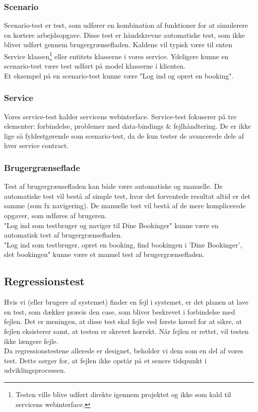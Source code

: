 \subsubsection{Scenario}
\label{Test_intendedStrat_types_sce}
Scenario-test er test, som udfører en kombination af funktioner for at simulerere en kortere arbejdsopgave. Disse test er håndskrevne automatiske test, som ikke bliver udført gennem brugergrænsefladen. Kaldene vil typisk være til enten Service klassen\footnote{Testen ville blive udført direkte igennem projektet og ikke som kald til servicens webinterface.} eller entitets klasserne i vores service. Ydeligere kunne en scenario-test være test udført på model klasserne i klienten. 
\\Et eksempel på en scenario-test kunne være "Log ind og opret en booking".

\subsubsection{Service}
\label{Test_intendedStrat_types_service}
Vores service-test kalder servicens webinterface. Service-test fokuserer på tre elementer: forbindelse, problemer med data-bindings \& fejlhåndtering. De er ikke lige så fyldestgørende som scenario-test, da de kun tester de avancerede dele af hver service contract.

\subsubsection{Brugergrænseflade}
\label{Test_intendedStrat_types_UI}
Test af brugergrænsefladen kan både være automatiske og manuelle. De automatiske test vil bestå af simple test, hvor det forventede resultat altid er det samme (som fx navigering). De manuelle test vil bestå af de mere komplicerede opgaver, som udføres af brugeren.
\\"Log ind som testbruger og naviger til Dine Bookinger" kunne være en automatisk test af brugergrænsefladen.
\\"Log ind som testbruger, opret en booking, find bookingen i 'Dine Bookinger', slet bookingen" kunne være et manuel test af brugergrænsefladen.

\subsection{Regressionstest}
\label{Test_intendedStrat_regression}
Hvis vi (eller brugere af systemet) finder en fejl i systemet, er det planen at lave en test, som dækker præcis den case, som bliver beskrevet i forbindelse med fejlen. Det er meningen, at disse test skal fejle ved første kørsel for at sikre, at fejlen eksisterer samt, at testen er skrevet korrekt. Når fejlen er rettet, vil testen ikke længere fejle.
\\Da regressionstestene allerede er designet, beholder vi dem som en del af vores test. Dette sørger for, at fejlen ikke opstår på et senere tidspunkt i udviklingsprocessen.

